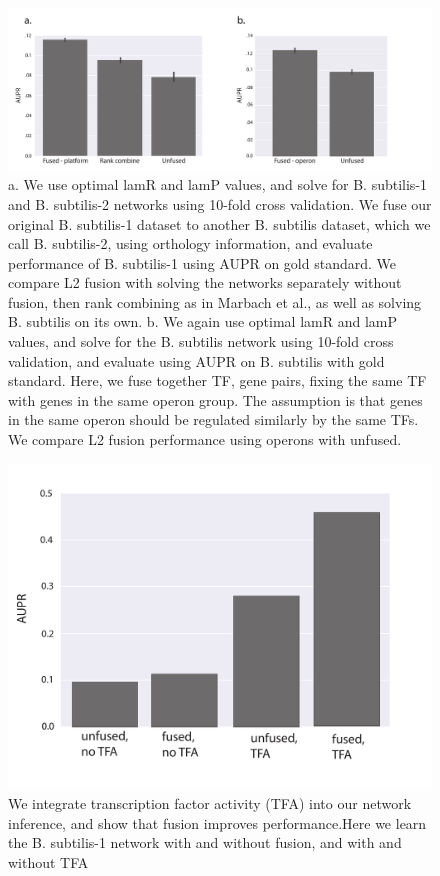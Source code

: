 \documentclass[11pt]{article}
\begin{document}
\begin{figure}
\begin{center}
  \includegraphics[scale=0.45]{fig6.pdf}
  \caption{\label{fusedl2-real} a. We use optimal lamR and lamP values, and solve for B. subtilis-1 and B. subtilis-2 networks using 10-fold cross validation. We fuse our original B. subtilis-1 dataset to another B. subtilis dataset, which we call B. subtilis-2, using orthology information, and evaluate performance of B. subtilis-1 using AUPR on gold standard. We compare L2 fusion with solving the networks separately without fusion, then rank combining as in Marbach et al., as well as solving B. subtilis on its own. b. We again use optimal lamR and lamP values, and solve for the B. subtilis network using 10-fold cross validation, and evaluate using AUPR on B. subtilis with gold standard. Here, we fuse together TF, gene pairs, fixing the same TF with genes in the same operon group. The assumption is that genes in the same operon should be regulated similarly by the same TFs. We compare L2 fusion performance using operons with unfused.}
\end{center}
\end{figure}

\begin{figure}
\begin{center}
  \includegraphics[scale=0.45]{fig7.pdf}
  \caption{\label{tfa} We integrate transcription factor activity (TFA) into our network inference, and show that fusion improves performance.Here we learn the B. subtilis-1 network with and without fusion, and with and without TFA}
\end{center}
\end{figure}
\end{document}
